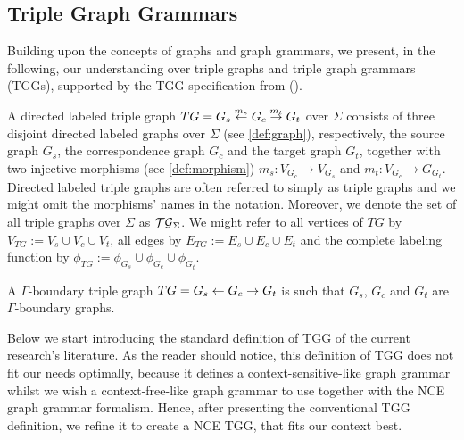 \documentclass[]{report}
\begin{document}
%



\subsection{Triple Graph Grammars}
Building upon the concepts of graphs and graph grammars, we present, in the following, our understanding over triple graphs and triple graph grammars (TGGs), supported by the TGG specification from (). %


\begin{definition}
	A directed labeled triple graph $TG = G_s \overset{m_s}{\leftarrow} G_c \overset{m_t}{\rightarrow} G_t$ over $\Sigma$ consists of three disjoint directed labeled graphs over $\Sigma$ (see \ref{def:graph}), respectively, the source graph $G_s$, the correspondence graph $G_c$ and the target graph $G_t$, together with two injective morphisms (see \ref{def:morphism}) $m_s: V_{G_c} \to V_{G_s}$ and $m_t : V_{G_c} \to G_{G_t}$. Directed labeled triple graphs are often referred to simply as triple graphs and we might omit the morphisms' names in the notation. Moreover, we denote the set of all triple graphs over $\Sigma$ as $\mathcal{TG}_{\Sigma}$. We might refer to all vertices of $TG$ by $V_{TG}:= V_s \cup V_c \cup V_t$, all edges by $E_{TG}:= E_s \cup E_c \cup E_t$ and the complete labeling function by $\phi_{TG}:= \phi_{G_s} \cup \phi_{G_c} \cup \phi_{G_t}$.
\end{definition}

\begin{definition}
	A $\Gamma\text{-boundary}$ triple graph $TG = G_s \overset{}{\leftarrow} G_c \overset{}{\rightarrow} G_t$ is such that $G_s$, $G_c$ and $G_t$ are $\Gamma\text{-boundary}$ graphs.
\end{definition}


Below we start introducing the standard definition of TGG of the current research's literature. As the reader should notice, this definition of TGG does not fit our needs optimally, because it defines a context-sensitive-like graph grammar whilst we wish a context-free-like graph grammar to use together with the NCE graph grammar formalism. Hence, after presenting the conventional TGG definition, we refine it to create a NCE TGG, that fits our context best.
\end{document}
